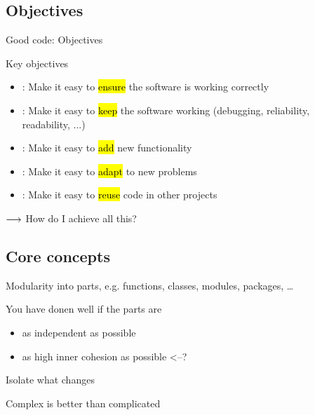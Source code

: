 
\subsection{Objectives}


\begin{frame}{Good code: Objectives}
\begin{block}{Key objectives}{\relax}
	\begin{itemize}
		\item {}: Make it easy to \hl{ensure} the software is working correctly
		\item {}: Make it easy to \hl{keep} the software working (debugging, reliability, readability, ...)
		\item {}: Make it easy to \hl{add} new functionality
		\item {}: Make it easy to \hl{adapt} to new problems
		\item {}: Make it easy to \hl{reuse} code in other projects
	\end{itemize}
\end{block}

\bigskip
{\Large $\longrightarrow$ How do I achieve all this?}

\end{frame}

\subsection{Core concepts}

\begin{frame}{Modularity}
	 into parts, e.g. functions, classes, modules, packages, \dots
	
	You have donen well if the parts are 
	\begin{itemize}
		\item as independent as possible
		\item as high inner cohesion as possible <--?
	\end{itemize}
	
	
\end{frame}

\begin{frame}{Isolate what changes}
	
\end{frame}

\begin{frame}{Complex is better than complicated}

\end{frame}




